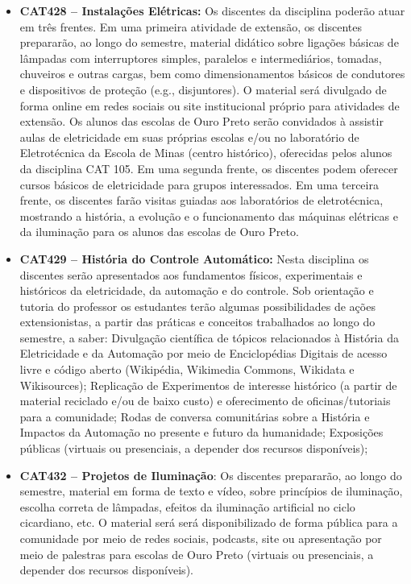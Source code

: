 \documentclass[
	12pt,				%
	openright,			%
	oneside,			%
	a4paper,			%
	english,			%
	brazil				%
	]{abntex2}
\begin{document}
\begin{itemize}
     \item \textbf{CAT428 -- Instalações Elétricas:} Os discentes da disciplina poderão atuar em três frentes. Em uma primeira atividade de extensão, os discentes prepararão, ao longo do semestre, material didático sobre ligações básicas de lâmpadas com interruptores simples, paralelos e intermediários, tomadas, chuveiros e outras cargas, bem como dimensionamentos básicos de condutores e dispositivos de proteção (e.g., disjuntores). O material será divulgado de forma online em redes sociais ou site institucional próprio para atividades de extensão. Os alunos das escolas de Ouro Preto serão convidados à assistir aulas de eletricidade em suas próprias escolas e/ou no laboratório de Eletrotécnica da Escola de Minas (centro histórico), oferecidas pelos alunos da disciplina CAT 105. Em uma segunda frente, os discentes podem oferecer cursos básicos de eletricidade para grupos interessados. Em uma terceira frente, os discentes farão visitas guiadas aos laboratórios de eletrotécnica, mostrando a história, a evolução e o funcionamento das máquinas elétricas e da iluminação para os alunos das escolas de Ouro Preto.

    \item \textbf{CAT429 -- História do Controle Automático:} Nesta disciplina os discentes serão apresentados aos fundamentos físicos, experimentais e históricos da eletricidade, da automação e do controle. Sob orientação e tutoria do professor os estudantes terão algumas possibilidades de ações extensionistas, a partir das práticas e conceitos trabalhados ao longo do semestre, a saber: Divulgação científica de tópicos relacionados à História da Eletricidade e da Automação por meio de Enciclopédias Digitais de acesso livre e código aberto (Wikipédia, Wikimedia Commons, Wikidata e Wikisources); Replicação de Experimentos de interesse histórico (a partir de material reciclado e/ou de baixo custo) e oferecimento de oficinas/tutoriais para a comunidade; Rodas de conversa comunitárias sobre a História e Impactos da Automação no presente e futuro da humanidade; Exposições públicas (virtuais ou presenciais, a depender dos recursos disponíveis);

    \item \textbf{CAT432 -- Projetos de Iluminação}: Os discentes prepararão, ao longo do semestre, material em forma de texto e vídeo, sobre princípios de iluminação, escolha correta de lâmpadas, efeitos da iluminação artificial no ciclo cicardiano, etc. O material será será disponibilizado de forma pública para a comunidade por meio de redes sociais, podcasts, site ou apresentação por meio de palestras para escolas de Ouro Preto (virtuais ou presenciais, a depender dos recursos disponíveis).
\end{itemize}
\end{document}
